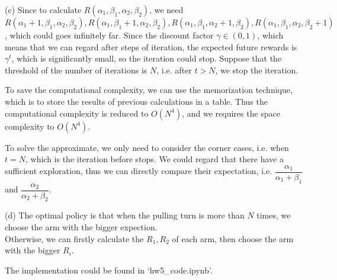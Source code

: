 \begin{homeworkProblem}
(c) Since to calculate $R(\alpha_1, \beta_1, \alpha_2, \beta_2)$, we need $R(\alpha_1+1, \beta_1, \alpha_2, \beta_2), R(\alpha_1, \beta_1+1, \alpha_2, \beta_2), R(\alpha_1, \beta_1, \alpha_2+1, \beta_2), R(\alpha_1, \beta_1, \alpha_2, \beta_2+1)$, which could goes infinitely far. Since the discount factor $\gamma\in(0,1)$, which means that we can regard after steps of iteration, the expected future rewards is $\gamma^t$, which is significantly small, so the iteration could stop. Suppose that the threshold of the number of iterations is $N$, i.e. after $t>N$, we stop the iteration.

To save the computational complexity, we can use the memorization technique, which is to store the results of previous calculations in a table. Thus the computational complexity is reduced to $O(N^4)$, and we requires the space complexity to $O(N^4)$.

To solve the approximate, we only need to consider the corner cases, i.e. when $t=N$, which is the iteration before stops. We could regard that there have a sufficient exploration, thus we can directly compare their expectation, i.e. $\dfrac{\alpha_1}{\alpha_1+\beta_1}$ and $\dfrac{\alpha_2}{\alpha_2+\beta_2}$.

(d) The optimal policy is that when the pulling turn is more than $N$ times, we choose the arm with the bigger expection. \\
Otherwise, we can firstly calculate the $R_1,R_2$ of each arm, then choose the arm with the bigger $R_i$.

The implementation could be found in `hw5\_code.ipynb'.

\end{homeworkProblem}

\newpage